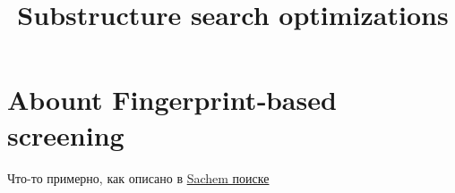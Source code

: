 \documentclass{article}
\title{Substructure search optimizations}
\begin{document}
\maketitle



\section{Abount Fingerprint‑based screening}

{\color{red} Что-то примерно, как описано в \href{https://jcheminf.biomedcentral.com/counter/pdf/10.1186/s13321-018-0282-y.pdf}{Sachem поиске}}







\end{document}
